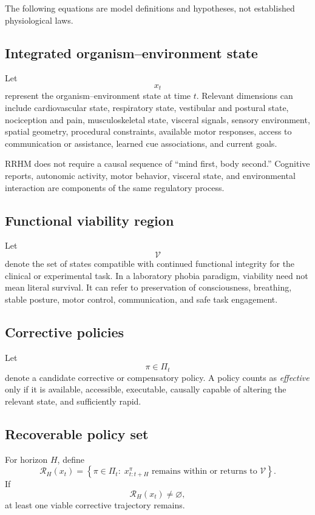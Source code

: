 \documentclass[11pt]{article}
\begin{document}
The following equations are model definitions and hypotheses, not established physiological laws.

\subsection{Integrated organism--environment state}

Let
\[
x_t
\]
represent the organism--environment state at time $t$. Relevant dimensions can include cardiovascular state, respiratory state, vestibular and postural state, nociception and pain, musculoskeletal state, visceral signals, sensory environment, spatial geometry, procedural constraints, available motor responses, access to communication or assistance, learned cue associations, and current goals.

RRHM does not require a causal sequence of ``mind first, body second.'' Cognitive reports, autonomic activity, motor behavior, visceral state, and environmental interaction are components of the same regulatory process.

\subsection{Functional viability region}

Let
\[
\mathcal{V}
\]
denote the set of states compatible with continued functional integrity for the clinical or experimental task. In a laboratory phobia paradigm, viability need not mean literal survival. It can refer to preservation of consciousness, breathing, stable posture, motor control, communication, and safe task engagement.

\subsection{Corrective policies}

Let
\[
\pi \in \Pi_t
\]
denote a candidate corrective or compensatory policy. A policy counts as \emph{effective} only if it is available, accessible, executable, causally capable of altering the relevant state, and sufficiently rapid.

\subsection{Recoverable policy set}

For horizon $H$, define
\[
\mathcal{R}_H(x_t)=\left\{\pi\in\Pi_t:\;x_{t:t+H}^{\pi}\text{ remains within or returns to }\mathcal{V}\right\}.
\]
If
\[
\mathcal{R}_H(x_t)\neq\varnothing,
\]
at least one viable corrective trajectory remains.
\end{document}

